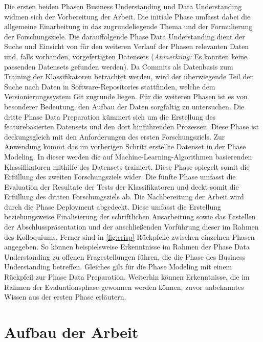 Die ersten beiden Phasen \glqq Business Understanding\grqq{} und \glqq Data Understanding\grqq{} widmen sich der Vorbereitung der Arbeit. Die initiale Phase umfasst dabei die allgemeine Einarbeitung in das zugrundeliegende Thema und der Formulierung der Forschungsziele. Die darauffolgende Phase \glqq Data Understanding\grqq{} dient der Suche und Einsicht von für den weiteren Verlauf der Phasen relevanten Daten und, falls vorhanden, vorgefertigten Datensets (\textit{Anmerkung:} Es konnten keine passenden Datensets gefunden werden). Da Commits als Datenbasis zum Training der Klassifikatoren betrachtet werden, wird der überwiegende Teil der Suche nach Daten in Software-Repositories stattfinden, welche dem Versionierungssystem Git zugrunde liegen. Für die weiteren Phasen ist es von besonderer Bedeutung, den Aufbau der Daten sorgfältig zu untersuchen. Die dritte Phase \glqq Data Preparation\grqq{} kümmert sich um die Erstellung des featurebasierten Datensets und den dort hinführenden Prozessen. Diese Phase ist deckungsgleich mit den Anforderungen des ersten Forschungsziels. Zur Anwendung kommt das im vorherigen Schritt erstellte Datenset in der Phase \glqq Modeling\grqq{}. In dieser werden die auf Machine-Learning-Algorithmen basierenden Klassifikatoren mithilfe des Datensets trainiert. Diese Phase spiegelt somit die Erfüllung des zweiten Forschungsziels wider. Die fünfte Phase umfasst die Evaluation der Resultate der Tests der Klassifikatoren und deckt somit die Erfüllung des dritten Forschungsziels ab. Die Nachbereitung der Arbeit wird durch die Phase \glqq Deployment\grqq{} abgedeckt. Diese umfasst die Erstellung beziehungsweise Finalisierung der schriftlichen Ausarbeitung sowie das Erstellen der Abschlusspräsentation und der anschließenden Vorführung dieser im Rahmen des Kolloquiums.
Ferner sind in \autoref{fig:crisp} Rückpfeile zwischen einzelnen Phasen angegeben. So können beispielsweise Erkenntnisse im Rahmen der Phase Data Understanding zu offenen Fragestellungen führen, die die Phase des Business Understanding betreffen. Gleiches gilt für die Phase Modeling mit einem Rückpfeil zur Phase Data Preparation. Weiterhin können Erkenntnisse, die im Rahmen der Evaluationsphase gewonnen werden können, zuvor unbekanntes Wissen aus der ersten Phase erläutern.

\section{Aufbau der Arbeit}

